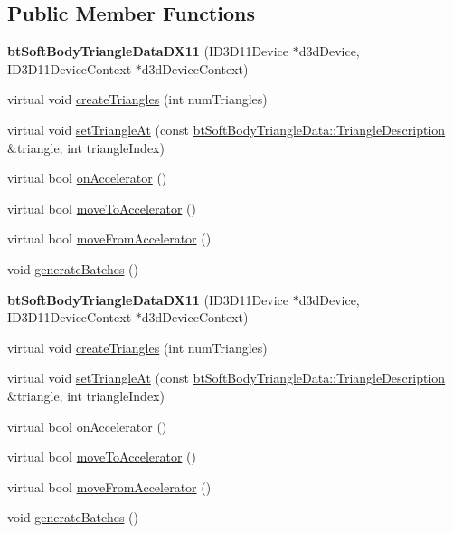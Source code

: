 \subsection*{Public Member Functions}
\begin{DoxyCompactItemize}
\item 
\mbox{\label{classbtSoftBodyTriangleDataDX11_a5b20fa5df829cbd5f3894103975c5327}} 
{\bfseries bt\+Soft\+Body\+Triangle\+Data\+D\+X11} (I\+D3\+D11\+Device $\ast$d3d\+Device, I\+D3\+D11\+Device\+Context $\ast$d3d\+Device\+Context)
\item 
virtual void \hyperlink{classbtSoftBodyTriangleDataDX11_a91fd155f00fac9ce8330f62b5fd4a26b}{create\+Triangles} (int num\+Triangles)
\item 
virtual void \hyperlink{classbtSoftBodyTriangleDataDX11_a134859f4ca5a7c32109b06651e8939a8}{set\+Triangle\+At} (const \hyperlink{classbtSoftBodyTriangleData_1_1TriangleDescription}{bt\+Soft\+Body\+Triangle\+Data\+::\+Triangle\+Description} \&triangle, int triangle\+Index)
\item 
virtual bool \hyperlink{classbtSoftBodyTriangleDataDX11_ae1dc56ae7688b61b271f2213296caf19}{on\+Accelerator} ()
\item 
virtual bool \hyperlink{classbtSoftBodyTriangleDataDX11_aa3d2af489f6521cdd95c152f49fcedff}{move\+To\+Accelerator} ()
\item 
virtual bool \hyperlink{classbtSoftBodyTriangleDataDX11_aeef8543b31e4ee314e7fdf971197276c}{move\+From\+Accelerator} ()
\item 
void \hyperlink{classbtSoftBodyTriangleDataDX11_af95827e1a6ec034b8fcca098eedc1026}{generate\+Batches} ()
\item 
\mbox{\label{classbtSoftBodyTriangleDataDX11_a5b20fa5df829cbd5f3894103975c5327}} 
{\bfseries bt\+Soft\+Body\+Triangle\+Data\+D\+X11} (I\+D3\+D11\+Device $\ast$d3d\+Device, I\+D3\+D11\+Device\+Context $\ast$d3d\+Device\+Context)
\item 
virtual void \hyperlink{classbtSoftBodyTriangleDataDX11_a0d97c5cd5e8f4d98f4d613038c239d26}{create\+Triangles} (int num\+Triangles)
\item 
virtual void \hyperlink{classbtSoftBodyTriangleDataDX11_af2bc183a8ee1ff160281d4039bcb9bb3}{set\+Triangle\+At} (const \hyperlink{classbtSoftBodyTriangleData_1_1TriangleDescription}{bt\+Soft\+Body\+Triangle\+Data\+::\+Triangle\+Description} \&triangle, int triangle\+Index)
\item 
virtual bool \hyperlink{classbtSoftBodyTriangleDataDX11_a337ba5c2142ee9571a6cce7871a59a37}{on\+Accelerator} ()
\item 
virtual bool \hyperlink{classbtSoftBodyTriangleDataDX11_a6885a4e276703f9dd643fab1d6035586}{move\+To\+Accelerator} ()
\item 
virtual bool \hyperlink{classbtSoftBodyTriangleDataDX11_a8b0e445184f7afe24741912aa5d93e72}{move\+From\+Accelerator} ()
\item 
void \hyperlink{classbtSoftBodyTriangleDataDX11_af95827e1a6ec034b8fcca098eedc1026}{generate\+Batches} ()
\end{DoxyCompactItemize}
